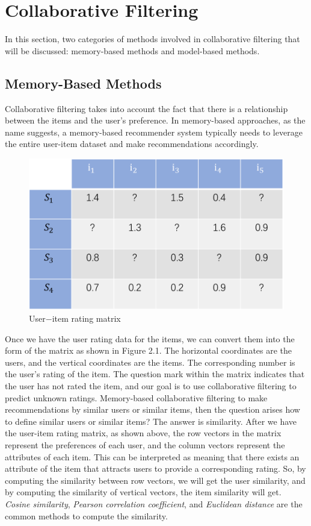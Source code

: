 \section{Collaborative Filtering}
In this section, two categories of methods involved in collaborative filtering that will be discussed: memory-based methods and model-based methods.
\subsection{Memory-Based Methods}
Collaborative filtering takes into account the fact that there is a relationship between the items and the user's preference. In memory-based approaches, as the name suggests, a memory-based recommender system typically needs to leverage the entire user-item dataset and make recommendations accordingly.
\begin{figure}[htbp]
\centering
\includegraphics[scale=0.7]{figure/cf1.png}
\caption{User$-$item rating matrix}
\end{figure}
Once we have the user rating data for the items, we can convert them into the form of the matrix as shown in Figure 2.1. The horizontal coordinates are the users, and the vertical coordinates are the items. The corresponding number is the user's rating of the item. The question mark within the matrix indicates that the user has not rated the item, and our goal is to use collaborative filtering to predict unknown ratings. Memory-based collaborative filtering to make recommendations by similar users or similar items, then the question arises how to define similar users or similar items? The answer is similarity. After we have the user-item rating matrix, as shown above, the row vectors in the matrix represent the preferences of each user, and the column vectors represent the attributes of each item. This can be interpreted as meaning that there exists an attribute of the item that attracts users to provide a corresponding rating. So, by computing the similarity between row vectors, we will get the user similarity, and by computing the similarity of vertical vectors, the item similarity will get. \textit{Cosine similarity}, \textit{Pearson correlation coefficient}, and \textit{Euclidean distance} are the common methods to compute the similarity.

